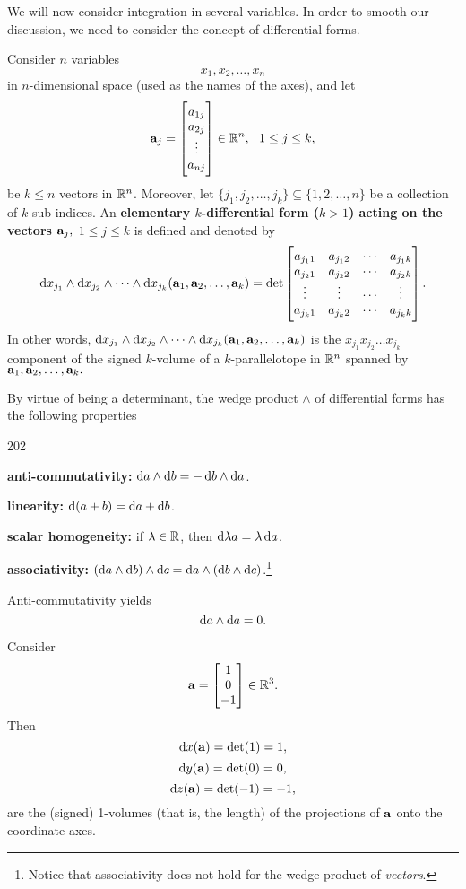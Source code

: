 We will now consider integration in several variables. In order to
smooth our discussion, we need to consider the concept of
differential forms.
\begin{df}
Consider $n$ variables $$x_1, x_2, \ldots , x_n$$  in
$n$-dimensional space (used as the names of the axes), and let
$$ {\mathbf a}_j = \begin{bmatrix} a_{1j} \\ a_{2j} \\ \vdots \\ a_{nj} \end{bmatrix} \in \mathbb{R}^n,  \ \ 1 \leq j \leq k,   $$
be $k \leq n$ vectors in $\mathbb{R}^n$. Moreover, let $\{j_1, j_2,
\ldots , j_k\} \subseteq \{1,2,\ldots, n\}$ be a collection of $k$
sub-indices. An \textbf{elementary $k$-differential form ($k > 1$)
acting on the vectors ${\mathbf a}_j,$ $ 1\leq j \leq k$} is defined
and denoted by
$$\d{x_{j_1}}\wedge\d{x_{j_2}}\wedge  \cdots\wedge \d{x_{j_k}} (\point{a}_1, \point{a_2}, \ldots , \point{a_k})
= \det \begin{bmatrix} a_{j_11} & a_{j_12} & \cdots & a_{j_1k} \cr
a_{j_21} & a_{j_22} & \cdots & a_{j_2k} \cr \vdots & \vdots &
\cdots & \vdots \cr a_{j_k1} & a_{j_k2} & \cdots & a_{j_kk} \cr
\end{bmatrix}.$$
In other words, $\d{x_{j_1}}\wedge\d{x_{j_2}}\wedge  \cdots\wedge
\d{x_{j_k}} (\point{a}_1, \point{a_2}, \ldots , \point{a_k})$ is the
$x_{j_1}x_{j_2}\ldots  x_{j_k}$ component of the signed $k$-volume
of a $k$-parallelotope in $\mathbb{R}^n$ spanned by ${\mathbf a}_1,
{\mathbf a_2}, \ldots , {\mathbf a_k}.$
\end{df}
\begin{rem}
By virtue of being a determinant, the wedge product $\wedge$ of
differential forms has the following properties
\begin{dingautolist}{202}
\item \textbf{ anti-commutativity:} $\d{a} \wedge \d{b} = -\d{b}\wedge
\d{a}$. \item \textbf{ linearity:} $\d{(a + b)} = \d{a} + \d{b}$.
\item \textbf{ scalar homogeneity:} if $\lambda \in \mathbb{R}$, then
$\d{\lambda a} = \lambda \d{a}$. \item \textbf{ associativity:}
$(\d{a} \wedge \d{b}) \wedge \d{c} = \d{a} \wedge (\d{b} \wedge
\d{c})$.\footnote{Notice that associativity does not hold for the
wedge product of {\em vectors}.}


\end{dingautolist}

\end{rem}
\begin{rem}
Anti-commutativity yields
$$\d{a} \wedge \d{a}  = 0.$$
\end{rem}
\begin{exa}
Consider $$ {\mathbf a} = \begin{bmatrix} 1 \\ 0 \\ -1 \end{bmatrix} \in \mathbb{R}^3.
$$ Then $$ \d{x}(\point{a}) = \det (1)
 = 1,$$ $$ \d{y}(\point{a}) = \det (0)
 = 0,$$ $$ \d{z}(\point{a}) = \det (-1)
 = -1,$$ are the (signed) 1-volumes (that is, the length) of the
 projections of ${\mathbf a}$ onto the coordinate axes.
\end{exa}

